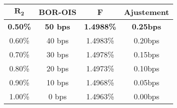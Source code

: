 \documentclass{article}
\begin{document}
\begin{center}
\begin{tabular}{|c|c|c|c|}  
\hline  
$\boldsymbol{R_2}$ & \textbf{BOR-OIS} & \textbf{F} & \textbf{Ajustement} \\ 
\hline  
\textbf{\color{red}0.50\%} & \textbf{\color{red}50 bps} & \textbf{\color{red}1.4988\%} & \textbf{\color{red}0.25bps}\\ 
0.60\% & 40 bps & 1.4983\% & 0.20bps\\ 
0.70\% & 30 bps & 1.4978\% & 0.15bps\\ 
0.80\% & 20 bps & 1.4973\% & 0.10bps\\ 
0.90\% & 10 bps & 1.4968\% & 0.05bps\\ 
1.00\% & 0 bps & 1.4963\% & 0.00bps\\ 
\hline  
\end{tabular}
\end{center}
\end{document}
